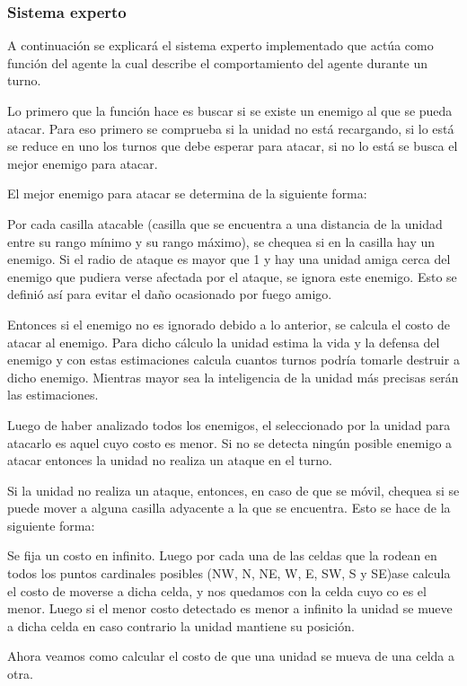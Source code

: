\subsubsection{Sistema experto}

A continuación se explicará el sistema experto implementado que actúa como función del agente la cual describe el comportamiento del agente durante un turno.


Lo primero que la función hace es buscar si se existe un enemigo al que se pueda atacar. Para eso primero se comprueba si la unidad no está recargando, si lo está se reduce en uno los turnos que debe esperar para atacar, si no lo está se busca el mejor enemigo para atacar. 
 
El mejor enemigo para atacar se determina de la siguiente forma:
 
Por cada casilla atacable (casilla que se encuentra a una distancia de la unidad entre su rango mínimo y su rango máximo), se chequea si en la casilla hay un enemigo. Si el radio de ataque es mayor que 1 y hay una unidad amiga cerca del enemigo que pudiera verse afectada por el ataque, se ignora este enemigo. Esto se definió así para evitar el daño ocasionado por fuego amigo.
 
Entonces si el enemigo no es ignorado debido a lo anterior, se calcula el costo de atacar al enemigo. Para dicho cálculo la unidad estima la vida y la defensa del enemigo y con estas estimaciones calcula cuantos turnos podría tomarle destruir a dicho enemigo. Mientras mayor sea la inteligencia de la unidad más precisas serán las estimaciones.

Luego de haber analizado todos los enemigos, el seleccionado por la unidad para atacarlo es aquel cuyo costo es menor. Si no se detecta ningún posible enemigo a atacar entonces la unidad no realiza un ataque en el turno.
 
Si la unidad no realiza un ataque, entonces, en caso de que se móvil, chequea si se puede mover a alguna casilla adyacente a la que se encuentra. Esto se hace de la siguiente forma:
 
Se fija un costo en infinito. Luego por cada una de las celdas que la rodean en todos los puntos cardinales posibles (NW, N, NE, W, E, SW, S y SE)ase calcula el costo de moverse a dicha celda, y nos quedamos con la celda cuyo co es el menor. Luego si el menor costo detectado es menor a infinito la unidad se mueve a dicha celda en caso contrario la unidad mantiene su posición. 
 
Ahora veamos como calcular el costo de que una unidad se mueva de una celda a otra.
 
